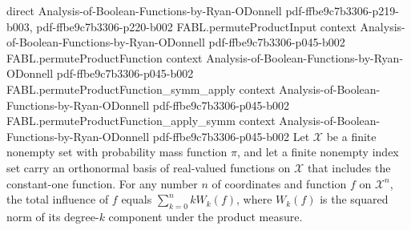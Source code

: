 \begin{theorem}
  {direct}
  {Analysis-of-Boolean-Functions-by-Ryan-ODonnell}
  {pdf-ffbe9c7b3306-p219-b003,
    pdf-ffbe9c7b3306-p220-b002}
\proofstep
  {FABL.permuteProductInput}
  {context}
  {Analysis-of-Boolean-Functions-by-Ryan-ODonnell}
  {pdf-ffbe9c7b3306-p045-b002}
\proofstep
  {FABL.permuteProductFunction}
  {context}
  {Analysis-of-Boolean-Functions-by-Ryan-ODonnell}
  {pdf-ffbe9c7b3306-p045-b002}
\proofstep
  {FABL.permuteProductFunction_symm_apply}
  {context}
  {Analysis-of-Boolean-Functions-by-Ryan-ODonnell}
  {pdf-ffbe9c7b3306-p045-b002}
\proofstep
  {FABL.permuteProductFunction_apply_symm}
  {context}
  {Analysis-of-Boolean-Functions-by-Ryan-ODonnell}
  {pdf-ffbe9c7b3306-p045-b002}
Let $\mathcal{X}$ be a finite nonempty set with probability mass function $\pi$, and let
a finite nonempty index set carry an orthonormal basis of real-valued functions on
$\mathcal{X}$ that includes the constant-one function. For any number $n$ of coordinates
and function $f$ on $\mathcal{X}^n$, the total influence of $f$ equals $\sum_{k=0}^{n} k
W_k(f)$, where $W_k(f)$ is the squared norm of its degree-$k$ component under the
product measure.
\end{theorem}

